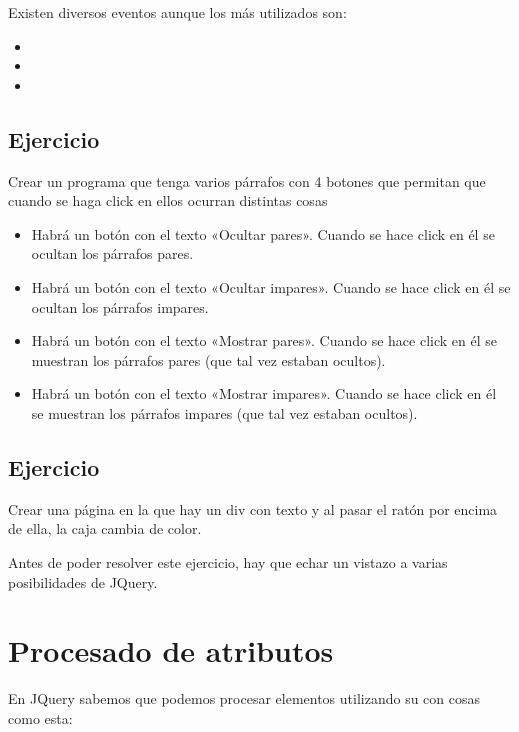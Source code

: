 \documentclass[letterpaper,10pt,spanish]{sphinxmanual}
\begin{document}
Existen diversos eventos aunque los más utilizados son:
\begin{itemize}
\item {} 

\item {} 

\item {} 

\end{itemize}


\subsection{Ejercicio}
\label{\detokenize{tema4:id5}}
Crear un programa que tenga varios párrafos con 4 botones que permitan que cuando se haga click en ellos ocurran distintas cosas
\begin{itemize}
\item {} 
Habrá un botón con el texto «Ocultar pares». Cuando se hace click en él se ocultan los párrafos pares.

\item {} 
Habrá un botón con el texto «Ocultar impares». Cuando se hace click en él se ocultan los párrafos impares.

\item {} 
Habrá un botón con el texto «Mostrar pares». Cuando se hace click en él se muestran los párrafos pares (que tal vez estaban ocultos).

\item {} 
Habrá un botón con el texto «Mostrar impares». Cuando se hace click en él se muestran los párrafos impares (que tal vez estaban ocultos).

\end{itemize}


\subsection{Ejercicio}
\label{\detokenize{tema4:id6}}
Crear una página en la que hay un div con texto y al pasar el ratón por encima de ella, la caja cambia de color.

Antes de poder resolver este ejercicio, hay que echar un vistazo a varias posibilidades de JQuery.


\section{Procesado de atributos}
\label{\detokenize{tema4:procesado-de-atributos}}
En JQuery sabemos que podemos procesar elementos utilizando su  con cosas como esta:
\end{document}

